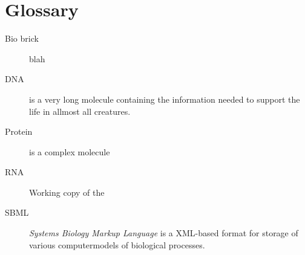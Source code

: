 \documentclass[a4paper]{article}
\begin{document}
\section{Glossary} %
\begin{description}
	\item[Bio brick] blah
	\item[DNA]  is a very long molecule containing the information needed to support the life in allmost all creatures.
	\item[Protein] is a complex molecule
	\item[RNA] Working copy of the
	\item[SBML] \textit{Systems Biology Markup Language} is a XML-based format for storage of various computermodels of biological processes.
\end{description}
\end{document}
